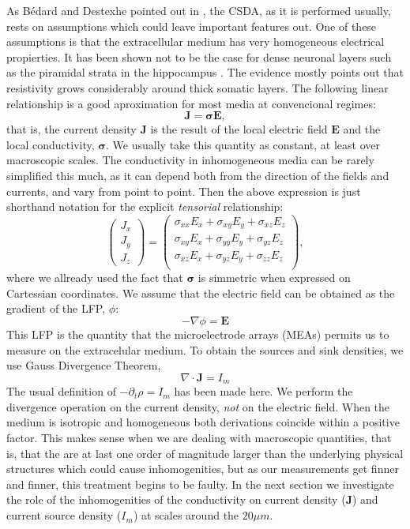 \documentclass{article}
\newcommand{\Jd}{\mathbf{J}}
\newcommand{\EF}{\mathbf{E}}
\newcommand{\cond}{\boldsymbol{\sigma}}
\begin{document}
As Bédard and Destexhe pointed out in \cite{Bedard11}, the CSDA, as it
is performed usually, rests on
assumptions which could leave important features out. One of these 
assumptions is that the extracellular medium has very homogeneous 
electrical propierties. It has been shown not to be
the case for dense neuronal layers such as the piramidal
strata in the hippocampus \cite{Holsheimer87, Lopez01, TrevinoPersonal}.
The evidence mostly points out that resistivity grows 
considerably around thick somatic layers.
The following linear relationship is a good aproximation for
most media at convencional regimes: 
\begin{equation}
\Jd=\cond \EF,
\end{equation}
that is, the current density $\Jd$ is the result of the
local electric field $\EF$ and the local conductivity, $\cond$.
We usually take this quantity as constant, 
at least over macroscopic scales.
The conductivity in inhomogeneous media can be rarely
simplified this much, as it can depend both from the direction
of the fields and currents, and vary from point to point. 
Then the above expression is just shorthand notation for the
explicit  \emph{tensorial} relationship:
\begin{equation}
  \begin{pmatrix}
    J_x \\
    J_y \\
    J_z
  \end{pmatrix}
  =
   \begin{pmatrix}
     \sigma_{xx}E_x+ \sigma_{xy}E_y+\sigma_{xz}E_z \\
     \sigma_{xy}E_x+ \sigma_{yy}E_y+\sigma_{yz}E_z \\
     \sigma_{xz}E_x+ \sigma_{yz}E_y+\sigma_{zz}E_z \\
  \end{pmatrix},
\end{equation}
where we allready used the fact that $\cond$ is simmetric when
expressed on Cartessian coordinates.
We assume that the electric field can be obtained as the
gradient of the LFP, $\phi$:
\begin{equation}
  -\nabla \phi=\EF
\end{equation}
This LFP is the quantity that the microelectrode arrays (MEAs) permits us
to measure on the extracelular medium.
To obtain the sources and sink densities, we use Gauss Divergence Theorem,
\begin{equation}
\nabla \cdot \Jd =I_m
\end{equation}
The usual definition of $-\partial_t \rho =I_m$ has been made here. 
We perform the divergence operation on the current density, \emph{not}
on the electric field. When the medium is isotropic and homogeneous
both derivations coincide within a positive factor.
This makes sense when we are dealing with macroscopic quantities,
that is, that the are at last one order of magnitude larger
than the underlying physical structures which could cause 
inhomogenities, but as our measurements get finner and finner,
this treatment begins to be faulty. 
In the next section we investigate the role of the inhomogenities 
of the conductivity on current density
($\Jd$) and current source density ($I_m$) at scales around
the $20\mu m$. 
\end{document}
